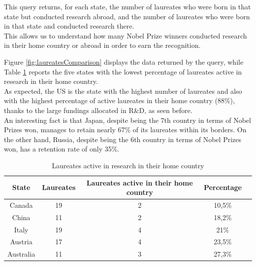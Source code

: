 \documentclass{article}
\begin{document}
\vspace{1em}

This query returns, for each state, the number of laureates who were born in that state but conducted research abroad, and the number of
laureates who were born in that state and conducted research there.\\
This allows us to understand how many Nobel Prize winners conducted research in their home country or abroad in order to earn the recognition.

Figure \ref{fig:laureatesComparison} displays the data returned by the query, while Table \ref{tab:laureates_active} reports the five states with the lowest percentage
of laureates active in research in their home country.\\
As expected, the US is the state with the highest number of laureates and also with the highest percentage
of active laureates in their home country (88\%), thanks to the large fundings allocated in R\&D, as seen before.\\
An interesting fact is that Japan, despite being the 7th country in terms of Nobel Prizes won, manages to retain nearly 67\% of its laureates
within its borders. On the other hand, Russia, despite being the 6th country in terms of Nobel Prizes won, has a retention rate of only 35\%.

\begin{table}[h!]
	\centering
	\begin{tabular}{|c|c|c|c|c|}
		\hline
		\textbf{State} & \textbf{Laureates} & \textbf{Laureates active in their home country} & \textbf{Percentage} \\ \hline
		Canada         & 19                 & 2                                               & 10,5\%              \\ \hline
		China          & 11                 & 2                                               & 18,2\%              \\ \hline
		Italy          & 19                 & 4                                               & 21\%                \\ \hline
		Austria        & 17                 & 4                                               & 23,5\%              \\ \hline
		Australia      & 11                 & 3                                               & 27,3\%              \\ \hline
	\end{tabular}
	\caption{Laureates active in research in their home country}
	\label{tab:laureates_active}
\end{table}
\end{document}
